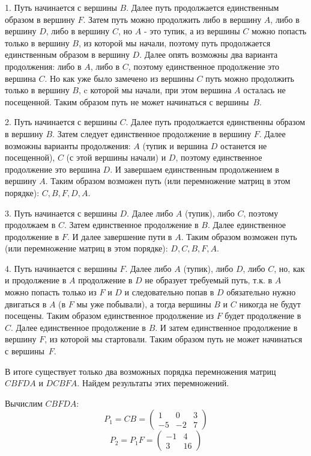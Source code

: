\documentclass{article}
\begin{document}
\par
1. Путь начинается с вершины $B$. Далее путь продолжается единственным образом в вершину $F$. Затем путь можно продолжить либо в вершину $A$, либо в вершину $D$, либо в вершину $C$, но $A$ - это тупик, а из вершины $C$ можно попасть только в вершину $B$, из которой мы начали, поэтому путь продолжается единственным образом в вершину $D$. Далее опять возможны два варианта продолжения: либо в $A$, либо в $C$, поэтому единственное продолжение это вершина $C$. Но как уже было замечено из вершины $C$ путь можно продолжить только в вершину $B$, c которой мы начали, при этом вершина $A$ осталась не посещенной. Таким образом путь не может начинаться с вершины~$B$.
\par
2. Путь начинается с вершины $C$. Далее путь продолжается единственны образом в вершину $B$. Затем следует единственное продолжение в вершину $F$. Далее возможны варианты продолжения: $A$ (тупик и вершина $D$ останется не посещенной), $C$ (с этой вершины начали) и $D$, поэтому единственное продолжение это вершина $D$. И завершаем единственным продолжением в вершину $A$. Таким образом возможен путь (или перемножение матриц в этом порядке): $C,B,F,D,A$.
\par
3. Путь начинается с вершины $D$. Далее либо $A$ (тупик), либо $C$, поэтому продолжаем в $C$. Затем единственное продолжение в $B$. Далее единственное продолжение в $F$. И далее завершение пути в $A$. Таким образом возможен путь (или перемножение матриц в этом порядке): $D,C,B,F,A$.
\par
4. Путь начинается с вершины $F$. Далее либо $A$ (тупик), либо $D$, либо $C$, но, как и продолжение в $A$ продолжение в $D$ не образует требуемый путь, т.к. в $A$ можно попасть только из $F$ и $D$ и следовательно попав в $D$ обязательно нужно двигаться в $A$ (в $F$ мы уже побывали), а тогда вершины $B$ и $C$ никогда не будут посещены. Таким образом единственное продолжение из $F$ будет продолжение в $C$. Далее единственное продолжение в $B$. И затем единственное продолжение в вершину $F$, из которой мы стартовали. Таким образом путь не может начинаться с вершины~$F$.
\par
В итоге существует только два возможных порядка перемножения матриц $CBFDA$ и $DCBFA$. Найдем результаты этих перемножений.
\par
Вычислим $CBFDA$:
$$P_1=CB=\left(\begin{array}{ccc}1 & 0 & 3\\-5 & -2 & 7\end{array}\right)$$
$$P_2=P_1F=\left(\begin{array}{cc}-1 & 4\\3 & 16\end{array}\right)$$
\end{document}
